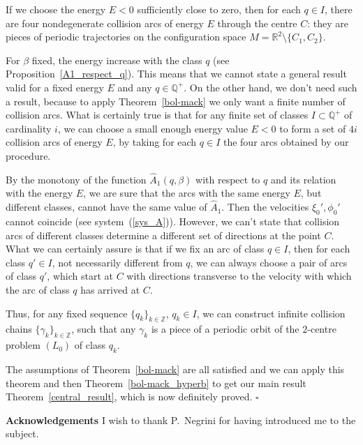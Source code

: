 \documentclass[a4paper]{article}
\begin{document}
If we choose the energy $E<0$ sufficiently close to zero, 
then for each $q \in I$, there are four  nondegenerate collision arcs 
of energy $E$ through the centre $C$: they are pieces of 
periodic trajectories on the configuration space 
$M={\mathbb{R}}^2 \setminus\{C_1,C_2\}$.

For $\beta$ fixed, the energy increase with the class $q$ (see 
Proposition~\ref{A1_respect_q}). This means that we 
cannot state a general result valid for a fixed energy $E$ and any $q\in {\mathbb{Q}}^+$. 
On the other hand, we don't need such a result, because to apply 
Theorem~\ref{bol-mack}   we only want a finite number of collision arcs. 
What is certainly true is that for any finite set of classes $I\subset {\mathbb{Q}}^+$ 
of cardinality $i$, we can choose a small enough energy value $E<0$ to form 
a set of $4i$ collision arcs of energy $E$, by taking for each $q\in I$ the 
four arcs obtained by our procedure. 

By the monotony of the function $\hat{A}_1(q,\beta)$ with respect to
$q$ and its relation with the energy $E$, we are sure that the arcs
with the same energy $E$, but different classes, cannot have the same
value of $\hat{A}_1$. Then the velocities $\xi_0',\phi_0'$ cannot
coincide (see system~(\ref{sys_A})).  However, we can't state that
collision arcs of different classes determine a different set of
directions at the point $C$. What we can certainly assure is that if
we fix an arc of class $q\in I$, then for each class $q' \in I$, not
necessarily different from $q$, we can always choose a pair of arcs of
class $q'$, which start at $C$ with directions transverse to the
velocity with which the arc of class $q$ has arrived at $C$.
    
Thus, for any fixed sequence $\{q_k\}_{k \in {\mathbb{Z}}}$, $q_k \in I$, we can
construct infinite collision chains $\{\gamma_k\}_{k \in {\mathbb{Z}}}$, such
that any $\gamma_k$ is a piece of a periodic orbit of the $2$-centre
problem $(L_0)$ of class $q_k$.
 
The assumptions of Theorem~\ref{bol-mack} are all satisfied and we can apply 
this theorem and then Theorem~\ref{bol-mack_hyperb}
to get our main result Theorem~\ref{central_result}, 
which is now definitely proved.
{$\square$\\}

\vspace{1cm}
{\bf Acknowledgements }
I wish to thank P.~Negrini for having introduced me to the subject.
\end{document}
